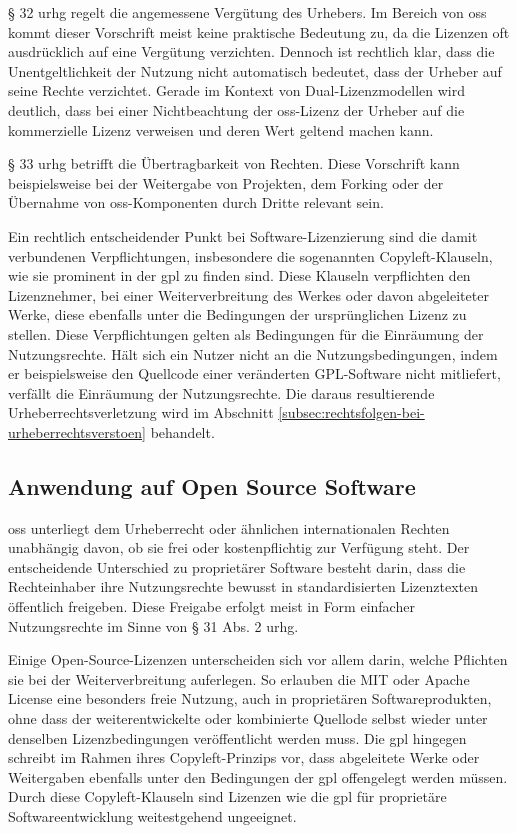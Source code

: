 § 32 \gls{urhg} regelt die angemessene Vergütung des Urhebers.
Im Bereich von \gls{oss} kommt dieser Vorschrift meist keine praktische Bedeutung zu, da die Lizenzen oft ausdrücklich auf eine Vergütung verzichten.
Dennoch ist rechtlich klar, dass die Unentgeltlichkeit der Nutzung nicht automatisch bedeutet, dass der Urheber auf seine Rechte verzichtet.
Gerade im Kontext von Dual-Lizenzmodellen wird deutlich, dass bei einer Nichtbeachtung der \gls{oss}-Lizenz der Urheber auf die kommerzielle Lizenz verweisen und deren Wert geltend machen kann.

§ 33 \gls{urhg} betrifft die Übertragbarkeit von Rechten.
Diese Vorschrift kann beispielsweise bei der Weitergabe von Projekten, dem Forking oder der Übernahme von \gls{oss}-Komponenten durch Dritte relevant sein.

Ein rechtlich entscheidender Punkt bei Software-Lizenzierung sind die damit verbundenen Verpflichtungen, insbesondere die sogenannten Copyleft-Klauseln, wie sie prominent in der \gls{gpl} zu finden sind.
Diese Klauseln verpflichten den Lizenznehmer, bei einer Weiterverbreitung des Werkes oder davon abgeleiteter Werke, diese ebenfalls unter die Bedingungen der ursprünglichen Lizenz zu stellen.
Diese Verpflichtungen gelten als Bedingungen für die Einräumung der Nutzungsrechte.
Hält sich ein Nutzer nicht an die Nutzungsbedingungen, indem er beispielsweise den Quellcode einer veränderten GPL-Software nicht mitliefert, verfällt die Einräumung der Nutzungsrechte.
Die daraus resultierende Urheberrechtsverletzung wird im Abschnitt \ref{subsec:rechtsfolgen-bei-urheberrechtsverstoen} behandelt.


\subsection{Anwendung auf Open Source Software}

\gls{oss} unterliegt dem Urheberrecht oder ähnlichen internationalen Rechten unabhängig davon, ob sie frei oder kostenpflichtig zur Verfügung steht.
Der entscheidende Unterschied zu proprietärer Software besteht darin, dass die Rechteinhaber ihre Nutzungsrechte bewusst in standardisierten Lizenztexten öffentlich freigeben.
Diese Freigabe erfolgt meist in Form einfacher Nutzungsrechte im Sinne von § 31 Abs. 2 \gls{urhg}.

Einige Open-Source-Lizenzen unterscheiden sich vor allem darin, welche Pflichten sie bei der Weiterverbreitung auferlegen.
So erlauben die MIT oder Apache License eine besonders freie Nutzung, auch in proprietären Softwareprodukten, ohne dass der weiterentwickelte oder kombinierte Quellode selbst wieder unter denselben Lizenzbedingungen veröffentlicht werden muss.
Die \gls{gpl} hingegen schreibt im Rahmen ihres Copyleft-Prinzips vor, dass abgeleitete Werke oder Weitergaben ebenfalls unter den Bedingungen der \gls{gpl} offengelegt werden müssen.
Durch diese Copyleft-Klauseln sind Lizenzen wie die \gls{gpl} für proprietäre Softwareentwicklung weitestgehend ungeeignet.


